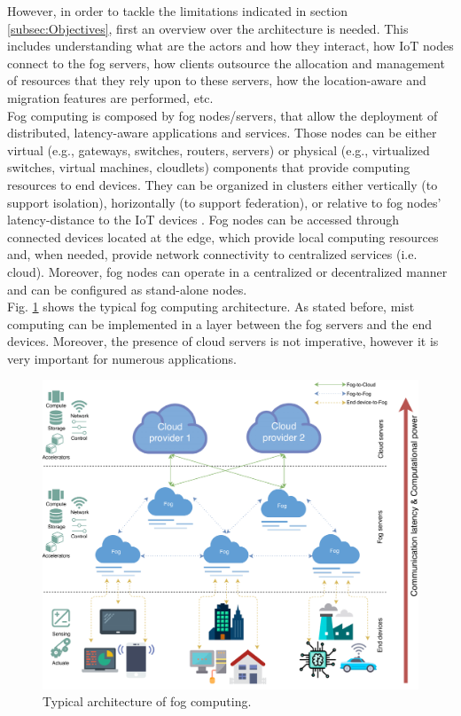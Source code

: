 However, in order to tackle the limitations indicated in section \ref{subsec:Objectives}, first an overview over the architecture is needed. This includes understanding what are the actors and how they interact, how IoT nodes connect to the fog servers, how clients outsource the allocation and management of resources that they rely upon to these servers, how the location-aware and migration features are performed, etc.\\
\noindent\tab Fog computing is composed by fog nodes/servers, that allow the deployment of distributed, latency-aware applications and services. Those nodes can be either virtual (e.g., gateways, switches, routers, servers) or physical (e.g., virtualized switches, virtual machines, cloudlets) components that provide computing resources to end devices. They can be organized in clusters either vertically (to support isolation), horizontally (to support federation), or relative to fog nodes’ latency-distance to the IoT devices \cite{iorga2018fog}. Fog nodes can be accessed through connected devices located at the edge, which provide local computing resources and, when needed, provide network connectivity to centralized services (i.e. cloud). Moreover, fog nodes can operate in a centralized or decentralized manner and can be configured as stand-alone nodes.\\
\noindent\tab Fig. \ref{fog_architecture} shows the typical fog computing architecture. As stated before, mist computing can be implemented in a layer between the fog servers and the end devices. Moreover, the presence of cloud servers is not imperative, however it is very important for numerous applications.
\begin{figure} [t]
	\centering
	\includegraphics[width=1.0\textwidth]{images/fog_architecture/fog_architecture}
	\caption{Typical architecture of fog computing.}
	\label{fog_architecture}
\end{figure}
